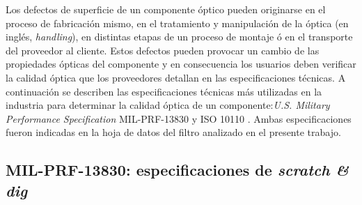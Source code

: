Los defectos de superficie de un componente óptico pueden originarse en el proceso de fabricación mismo, en el tratamiento y manipulación de la óptica (en inglés, \textit{handling}), en distintas etapas de un proceso de montaje ó en el transporte del proveedor al cliente. Estos defectos pueden provocar un cambio de las propiedades ópticas del componente y en consecuencia los usuarios deben verificar la calidad óptica que los proveedores detallan en las especificaciones técnicas. A continuación se describen las especificaciones técnicas más utilizadas en la industria para determinar la calidad óptica de un componente:\textit{U.S. Military Performance Specification} MIL-PRF-13830 \cite{milprf}y ISO 10110 \cite{iso10110}. Ambas especificaciones fueron indicadas en la hoja de datos del filtro analizado en el presente trabajo.

\singlespacing
\subsection{MIL-PRF-13830: especificaciones de \textit{scratch \& dig}}
\label{sec:scanddig}

